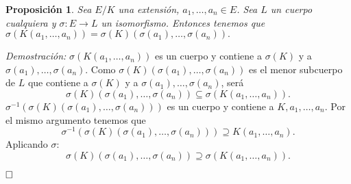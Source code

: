 \documentclass[12pt]{article}
\newtheorem{proposition}[theorem]{Proposición}
\begin{document}
\begin{proposition}\label{eq:sigK} Sea $E/K$ una extensión, $a_{1}, \ldots, a_{n} \in E$. Sea $L$ un cuerpo cualquiera y $\sigma \colon E \longrightarrow L$ un isomorfismo. Entonces tenemos que $\sigma(K(a_{1}, \ldots, a_{n})) = \sigma(K)(\sigma(a_{1}), \ldots, \sigma(a_{n})).$
\end{proposition}
\emph{Demostración: }$\sigma(K(a_{1}, \ldots, a_{n}))$ es un cuerpo y contiene a $\sigma(K)$ y a $\sigma(a_{1}), \ldots, \sigma(a_{n})$. Como $\sigma(K)(\sigma(a_{1}), \ldots, \sigma(a_{n}))$ es el menor subcuerpo de $L$ que contiene a $\sigma(K)$ y a $\sigma(a_{1}), \ldots, \sigma(a_{n})$, será $$\sigma(K)(\sigma(a_{1}), \ldots, \sigma(a_{n})) \subseteq \sigma(K(a_{1}, \ldots, a_{n})).$$ $\sigma^{-1}(\sigma(K)(\sigma(a_{1}), \ldots, \sigma(a_{n})))$ es un cuerpo y contiene a $K, a_{1}, \ldots, a_{n}$. Por el mismo argumento tenemos que $$\sigma^{-1}(\sigma(K)(\sigma(a_{1}), \ldots, \sigma(a_{n})))\supseteq K(a_{1}, \ldots, a_{n}).$$ Aplicando $\sigma:$ $$\sigma(K)(\sigma(a_{1}), \ldots, \sigma(a_{n})) \supseteq \sigma(K(a_{1}, \ldots, a_{n})).$$

$\hfill \square$
\end{document}
